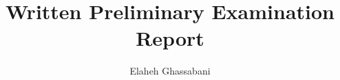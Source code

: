 \documentclass{sig-alternate-05-2015}
\begin{document}
\newcommand{\mike}[1]{\textcolor{red}{#1}}
\newcommand{\fixed}[1]{\textcolor{purple}{#1}}
\newcommand{\andrew}[1]{\textcolor{green}{#1}}
\newcommand{\ela}[1]{\textcolor{blue}{#1}}
\newcommand{\stateequiv}{\equiv_{s}}
\newcommand{\traceequiv}{\equiv_{\sigma}}
\newcommand{\ta}{\text{TA}}
\newcommand{\cta}{\text{TA$_{C}$}}
\newcommand{\tta}{\text{TA$_{T}$}}

\newcommand{\bfalg}{{IVC\_BF}\xspace}
\newcommand{\ucalg}{{IVC\_UC}\xspace}
\newcommand{\ucbfalg}{{IVC\_UCBF}\xspace}
\newcommand{\mustalg}{{IVC\_MUST}\xspace}

\newtheorem{definition}{Definition}
\newtheorem{lemma}{Lemma}
\newtheorem{theorem}{Theorem}
\newtheorem{coroll}{Corollary}
%
\title{Written Preliminary Examination Report}
%
\author{
%
%
\alignauthor
Elaheh Ghassabani\\
       \\
       \\
       \\
       }



\maketitle
\end{document}
